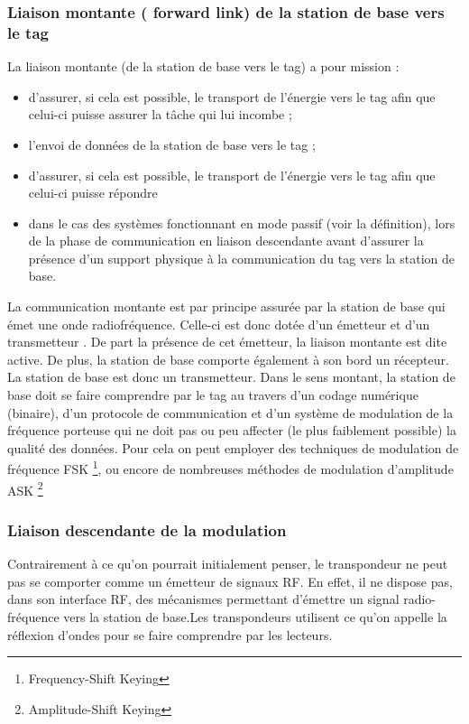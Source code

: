 \documentclass[11pt, a4paper, twoside]{book}
\begin{document}
\subsubsection{Liaison montante ( forward link) de la station de base vers le tag}
La liaison montante (de la station de base vers le tag) a pour mission :
\begin{itemize}
\item d'assurer, si cela est possible, le transport de l'énergie vers le tag afin que celui-ci puisse assurer la tâche qui lui incombe ;
\item l'envoi de données de la station de base vers le tag ;
\item d'assurer, si cela est possible, le transport de l'énergie vers le tag afin que celui-ci puisse répondre
\item dans le cas des systèmes fonctionnant en mode passif (voir la définition), lors de la phase de communication en liaison descendante avant d'assurer la présence d'un support physique à la communication du tag vers la station de base.\\
\end{itemize}
La communication montante est par principe assurée par  la station de base qui émet une onde radiofréquence. Celle-ci est donc dotée d’un émetteur et d'un transmetteur . De part la présence de cet émetteur, la liaison montante est dite active. De plus, la station de base comporte également à son bord un récepteur. La station de base est donc un transmetteur. Dans le sens montant, la station de base doit se faire comprendre par le tag au travers d’un codage numérique (binaire), d’un protocole de communication et d’un système de modulation de la fréquence porteuse qui ne doit pas ou peu affecter (le plus faiblement possible) la qualité des données. Pour cela on peut employer des techniques de modulation de fréquence FSK \footnote{Frequency-Shift Keying}, ou encore de nombreuses méthodes de modulation d’amplitude ASK \footnote{Amplitude-Shift Keying}
\subsubsection{Liaison descendante de la modulation}
Contrairement à ce qu'on pourrait initialement penser, le transpondeur ne peut pas se comporter comme un émetteur de signaux RF. En effet, il ne dispose pas, dans son interface RF, des mécanismes permettant d'émettre un signal radio-fréquence vers la station de base.Les transpondeurs utilisent ce qu'on appelle la réflexion d'ondes pour se faire comprendre par les lecteurs. \\
\end{document}
